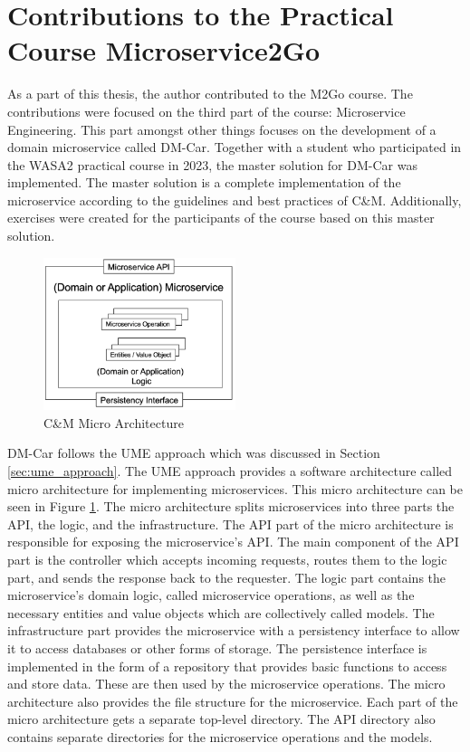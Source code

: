 \section{Contributions to the Practical Course Microservice2Go}
\label{sec:m2g_contribution}

As a part of this thesis, the author contributed to the M2Go course. The
contributions were focused on the third part of the course: Microservice
Engineering. This part amongst other things focuses on the development of a
domain microservice called DM-Car. Together with a student \cite{La23} who
participated in the WASA2 practical course in 2023, the master solution for
DM-Car was implemented. The master solution is a complete implementation of the
microservice according to the guidelines and best practices of C\&M.
Additionally, exercises were created for the participants of the course based
on this master solution.

\begin{figure}[tb]
	\centering
	\includegraphics[width=0.5\textwidth]{figures/micro_architecture.png}
	\caption{C\&M Micro Architecture \cite{CM-W-IMP}}
	\label{fig:micro_architecture}
\end{figure}

DM-Car follows the UME approach which was discussed in Section
\ref{sec:ume_approach}. The UME approach provides a software architecture
called micro architecture for implementing microservices. This micro
architecture can be seen in Figure \ref{fig:micro_architecture}. The micro
architecture splits microservices into three parts the API, the logic, and the
infrastructure. The API part of the micro architecture is responsible for
exposing the microservice's API. The main component of the API part is the
controller which accepts incoming requests, routes them to the logic part, and
sends the response back to the requester. The logic part contains the
microservice's domain logic, called microservice operations, as well as the
necessary entities and value objects which are collectively called models. The
infrastructure part provides the microservice with a persistency interface to
allow it to access databases or other forms of storage. The persistence
interface is implemented in the form of a repository that provides basic
functions to access and store data. These are then used by the microservice
operations. The micro architecture also provides the file structure for the
microservice. Each part of the micro architecture gets a separate top-level
directory. The API directory also contains separate directories for the
microservice operations and the models.

